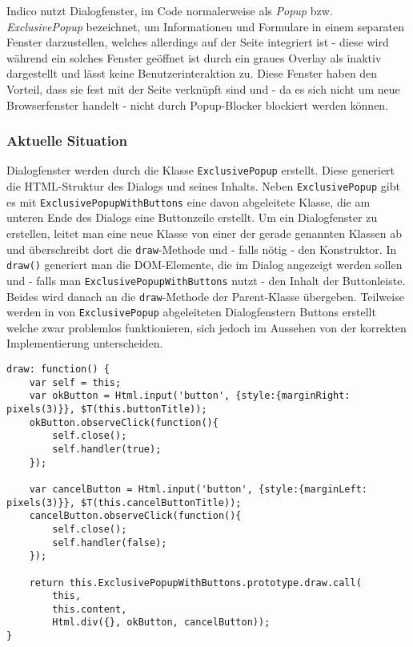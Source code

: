 Indico nutzt Dialogfenster, im Code normalerweise als \emph{Popup} bzw. \emph{ExclusivePopup}
bezeichnet, um Informationen und Formulare in einem separaten Fenster darzustellen, welches
allerdings auf der Seite integriert ist - diese wird während ein solches Fenster geöffnet ist durch
ein graues Overlay als inaktiv dargestellt und lässt keine Benutzerinteraktion zu. Diese Fenster
haben den Vorteil, dass sie fest mit der Seite verknüpft sind und - da es sich nicht um neue
Browserfenster handelt - nicht durch Popup-Blocker blockiert werden können.

\subsubsection{Aktuelle Situation}

Dialogfenster werden durch die Klasse \lstinline{ExclusivePopup} erstellt. Diese generiert die
HTML-Struktur des Dialogs und seines Inhalts. Neben \lstinline{ExclusivePopup} gibt es mit
\lstinline{ExclusivePopupWithButtons} eine davon abgeleitete Klasse, die am unteren Ende des
Dialogs eine Buttonzeile erstellt. Um ein Dialogfenster zu erstellen, leitet man eine neue Klasse
von einer der gerade genannten Klassen ab und überschreibt dort die \lstinline{draw}-Methode und -
falls nötig - den Konstruktor. In \lstinline{draw()} generiert man die DOM-Elemente, die im Dialog
angezeigt werden sollen und - falls man \lstinline{ExclusivePopupWithButtons} nutzt - den Inhalt der
Buttonleiste. Beides wird danach an die \lstinline{draw}-Methode der Parent-Klasse übergeben.
Teilweise werden in von \lstinline{ExclusivePopup} abgeleiteten Dialogfenstern Buttons erstellt welche
zwar problemlos funktionieren, sich jedoch im Aussehen von der korrekten Implementierung
unterscheiden.

\begin{lstlisting}[label=lst:confirmpopup-old,caption=Indico-Code zum Erstellen eines simplen Dialogfensters]
draw: function() {
    var self = this;
    var okButton = Html.input('button', {style:{marginRight: pixels(3)}}, $T(this.buttonTitle));
    okButton.observeClick(function(){
        self.close();
        self.handler(true);
    });

    var cancelButton = Html.input('button', {style:{marginLeft: pixels(3)}}, $T(this.cancelButtonTitle));
    cancelButton.observeClick(function(){
        self.close();
        self.handler(false);
    });

    return this.ExclusivePopupWithButtons.prototype.draw.call(
        this,
        this.content,
        Html.div({}, okButton, cancelButton));
}
\end{lstlisting}


